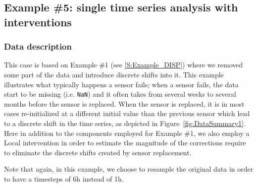 \subsection{Example \#5: single time series analysis with interventions}
\label{S:Example_DISP_intervention}
\subsubsection{Data description}
This case is based on Example \#1 (see \ref{S:Example_DISP}) where we removed some part of the data and introduce discrete shifts into it. This example illustrates what typically happens a sensor fails; when a sensor fails, the data start to be missing (i.e. \lstinline[basicstyle = \mlttfamily \small, backgroundcolor = \color{light-gray}]!NaN!) and it often takes from several weeks to several months before the sensor is replaced. When the sensor is replaced, it is in most cases re-initialized at a different initial value than the previous sensor which lead to a discrete shift in the time series, as depicted in Figure~\ref{fig:DataSummary1}. Here in addition to the components employed for Example \#1, we also employ a Local intervention in order to estimate the magnitude of the corrections require to eliminate the discrete shifts created by sensor replacement.

Note that again, in this example, we choose to resample the original data in order to have a timesteps of 6h instead of 1h. 

